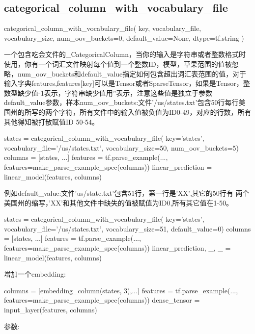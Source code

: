 \subsection{categorical\_column\_with\_vocabulary\_file}
\begin{python}
categorical_column_with_vocabulary_file(
    key,
    vocabulary_file,
    vocabulary_size,
    num_oov_buckets=0,
    default_value=None,
    dtype=tf.string
)
\end{python}
一个包含吃会文件的\_CategoricalColumn，当你的输入是字符串或者整数格式时使用，你有一个词汇文件映射每个值到一个整数ID，模型，草果范围的值被忽略，num\_oov\_buckets和default\_value指定如何包含超出词汇表范围的值，对于输入字典features,features[key]可以是Tensor或者SparseTensor，如果是Tensor，整数型缺少值-1表示，字符串缺少值用''表示，注意这些值是独立于参数default\_value参数，样本num\_oov\_buckets:文件'/us/states.txt'包含50行每行美国州的所写的两个字符，所有文件中的输入值被负值为ID0-49，对应的行数，所有其他得知被打散赋值ID 50-54。
\begin{python}
states = categorical_column_with_vocabulary_file(
    key='states', vocabulary_file='/us/states.txt', vocabulary_size=50,
    num_oov_buckets=5)
columns = [states, ...]
features = tf.parse_example(..., features=make_parse_example_spec(columns))
linear_prediction = linear_model(features, columns)
\end{python}
例如default\_value:文件'us/state.txt'包含51行，第一行是'XX',其它的50行有
两个美国州的缩写，'XX'和其他文件中缺失的值被赋值为ID0,所有其它值在1-50。
\begin{python}
states = categorical_column_with_vocabulary_file(
    key='states', vocabulary_file='/us/states.txt', vocabulary_size=51,
    default_value=0)
columns = [states, ...]
features = tf.parse_example(..., features=make_parse_example_spec(columns))
linear_prediction, _, _ = linear_model(features, columns)
\end{python}
增加一个embedding:
\begin{python}
columns = [embedding_column(states, 3),...]
features = tf.parse_example(..., features=make_parse_example_spec(columns))
dense_tensor = input_layer(features, columns)
\end{python}
参数:
